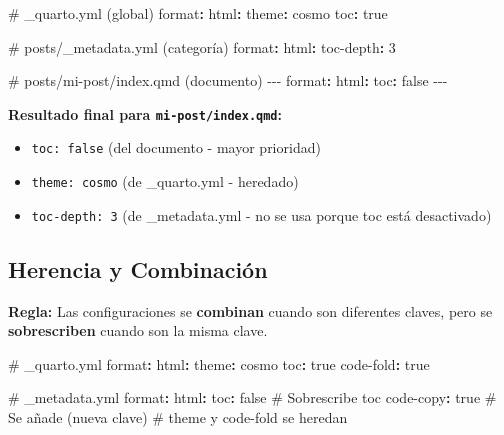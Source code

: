 \documentclass[
  doc,
  floatsintext,
  longtable,
  a4paper,
  nolmodern,
  notxfonts,
  notimes,
  12pt,
  colorlinks=true,linkcolor=blue,citecolor=blue,urlcolor=blue]{apa7}
\newenvironment{Shaded}{\begin{snugshade}}{\end{snugshade}}
\newcommand{\AttributeTok}[1]{\textcolor[rgb]{0.40,0.45,0.13}{#1}}
\newcommand{\CharTok}[1]{\textcolor[rgb]{0.13,0.47,0.30}{#1}}
\newcommand{\CommentTok}[1]{\textcolor[rgb]{0.37,0.37,0.37}{#1}}
\newcommand{\DecValTok}[1]{\textcolor[rgb]{0.68,0.00,0.00}{#1}}
\newcommand{\FunctionTok}[1]{\textcolor[rgb]{0.28,0.35,0.67}{#1}}
\newcommand{\KeywordTok}[1]{\textcolor[rgb]{0.00,0.23,0.31}{\textbf{#1}}}
\newcommand{\PreprocessorTok}[1]{\textcolor[rgb]{0.68,0.00,0.00}{#1}}
\providecommand{\tightlist}{%
  \setlength{\itemsep}{0pt}\setlength{\parskip}{0pt}}
\begin{document}
\begin{Shaded}
\begin{Highlighting}[]
\CommentTok{\# \_quarto.yml (global)}
\FunctionTok{format}\KeywordTok{:}
\AttributeTok{  }\FunctionTok{html}\KeywordTok{:}
\AttributeTok{    }\FunctionTok{theme}\KeywordTok{:}\AttributeTok{ cosmo}
\AttributeTok{    }\FunctionTok{toc}\KeywordTok{:}\AttributeTok{ }\CharTok{true}

\CommentTok{\# posts/\_metadata.yml (categoría)}
\FunctionTok{format}\KeywordTok{:}
\AttributeTok{  }\FunctionTok{html}\KeywordTok{:}
\AttributeTok{    }\FunctionTok{toc{-}depth}\KeywordTok{:}\AttributeTok{ }\DecValTok{3}

\CommentTok{\# posts/mi{-}post/index.qmd (documento)}
\PreprocessorTok{{-}{-}{-}}
\FunctionTok{format}\KeywordTok{:}
\AttributeTok{  }\FunctionTok{html}\KeywordTok{:}
\AttributeTok{    }\FunctionTok{toc}\KeywordTok{:}\AttributeTok{ }\CharTok{false}
\PreprocessorTok{{-}{-}{-}}
\end{Highlighting}
\end{Shaded}

\textbf{Resultado final para \texttt{mi-post/index.qmd}:}

\begin{itemize}
\tightlist
\item
  \texttt{toc:\ false} (del documento - mayor prioridad)
\item
  \texttt{theme:\ cosmo} (de \_quarto.yml - heredado)
\item
  \texttt{toc-depth:\ 3} (de \_metadata.yml - no se usa porque toc está
  desactivado)
\end{itemize}

\subsection{Herencia y Combinación}\label{herencia-y-combinaciuxf3n}

\textbf{Regla:} Las configuraciones se \textbf{combinan} cuando son
diferentes claves, pero se \textbf{sobrescriben} cuando son la misma
clave.

\begin{Shaded}
\begin{Highlighting}[]
\CommentTok{\# \_quarto.yml}
\FunctionTok{format}\KeywordTok{:}
\AttributeTok{  }\FunctionTok{html}\KeywordTok{:}
\AttributeTok{    }\FunctionTok{theme}\KeywordTok{:}\AttributeTok{ cosmo}
\AttributeTok{    }\FunctionTok{toc}\KeywordTok{:}\AttributeTok{ }\CharTok{true}
\AttributeTok{    }\FunctionTok{code{-}fold}\KeywordTok{:}\AttributeTok{ }\CharTok{true}

\CommentTok{\# \_metadata.yml}
\FunctionTok{format}\KeywordTok{:}
\AttributeTok{  }\FunctionTok{html}\KeywordTok{:}
\AttributeTok{    }\FunctionTok{toc}\KeywordTok{:}\AttributeTok{ }\CharTok{false}\CommentTok{        \# Sobrescribe toc}
\AttributeTok{    }\FunctionTok{code{-}copy}\KeywordTok{:}\AttributeTok{ }\CharTok{true}\CommentTok{   \# Se añade (nueva clave)}
\CommentTok{    \# theme y code{-}fold se heredan}
\end{Highlighting}
\end{Shaded}
\end{document}
